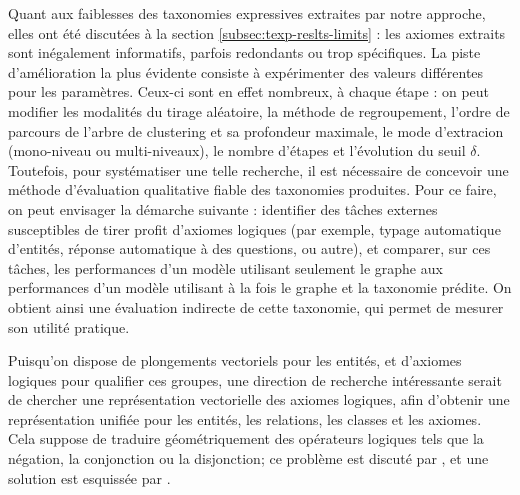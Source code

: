 Quant aux faiblesses des taxonomies expressives extraites par notre approche, elles ont été discutées à la section \ref{subsec:texp-reslts-limits} : les axiomes extraits sont inégalement informatifs, parfois redondants ou trop spécifiques. La piste d'amélioration la plus évidente consiste à expérimenter des valeurs différentes pour les paramètres. Ceux-ci sont en effet nombreux, à chaque étape : on peut modifier les modalités du tirage aléatoire, la méthode de regroupement, l'ordre de parcours de l'arbre de clustering et sa profondeur maximale, le mode d'extracion (mono-niveau ou multi-niveaux), le nombre d'étapes et l'évolution du seuil $\delta$. Toutefois, pour systématiser une telle recherche, il est nécessaire de concevoir une méthode d'évaluation qualitative fiable des taxonomies produites. Pour ce faire, on peut envisager la démarche suivante : identifier des tâches externes susceptibles de tirer profit d'axiomes logiques (par exemple, typage automatique d'entités, réponse automatique à des questions, ou autre), et comparer, sur ces tâches, les performances d'un modèle utilisant seulement le graphe aux performances d'un modèle utilisant à la fois le graphe et la taxonomie prédite. On obtient ainsi une évaluation indirecte de cette taxonomie, qui permet de mesurer son utilité pratique.



Puisqu'on dispose de plongements vectoriels pour les entités, et d'axiomes logiques pour qualifier ces groupes, une direction de recherche intéressante serait de chercher une représentation vectorielle des axiomes logiques, afin d'obtenir une représentation unifiée pour les entités, les relations, les classes et les axiomes. 
Cela suppose de traduire géométriquement des opérateurs logiques tels que la négation, la conjonction ou la disjonction; ce problème est discuté par
\cite{gutierrez2018knowledge}, et une solution est esquissée par \cite{hao2019universal}.
